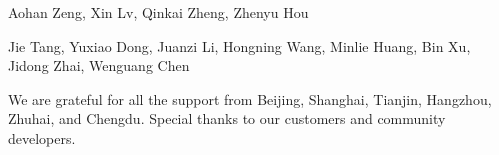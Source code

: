 Aohan Zeng, Xin Lv, Qinkai Zheng, Zhenyu Hou

Jie Tang, Yuxiao Dong, Juanzi Li, Hongning Wang, Minlie Huang, Bin Xu, Jidong Zhai, Wenguang Chen

We are grateful for all the support from Beijing, Shanghai, Tianjin, Hangzhou, Zhuhai, and Chengdu.
Special thanks to our customers and community developers.

